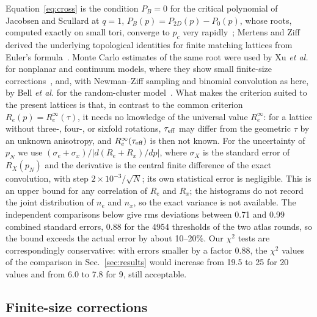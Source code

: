 \documentclass[pre,twocolumn,superscriptaddress,longbibliography,floatfix]{revtex4-2}
\newcommand{\pc}{p_c}
\begin{document}
Equation~\eqref{eq:cross} is the condition $P_B=0$ for the critical polynomial of Jacobsen and Scullard at $q=1$, $P_B(p)=P_{2D}(p)-P_0(p)$, whose roots, computed exactly on small tori, converge to $\pc$ very rapidly~\cite{JacobsenScullard13,Jacobsen14}; Mertens and Ziff derived the underlying topological identities for finite matching lattices from Euler's formula~\cite{MertensZiff16}. Monte Carlo estimates of the same root were used by Xu \textit{et al.} for nonplanar and continuum models, where they show small finite-size corrections~\cite{Xu21}, and, with Newman--Ziff sampling and binomial convolution as here, by Bell \textit{et al.} for the random-cluster model~\cite{Bell22}. What makes the criterion suited to the present lattices is that, in contrast to the common criterion $R_e(p)=R_e^\infty(\tau)$, it needs no knowledge of the universal value $R_e^\infty$: for a lattice without three-, four-, or sixfold rotations, $\tau_{\rm eff}$ may differ from the geometric $\tau$ by an unknown anisotropy, and $R_e^\infty(\tau_{\rm eff})$ is then not known. For the uncertainty of $p_N$ we use $(\sigma_e+\sigma_x)/|d(R_e+R_x)/dp|$, where $\sigma_X$ is the standard error of $R_X(p_N)$ and the derivative is the central finite difference of the exact convolution, with step $2\times10^{-3}/\sqrt N$; its own statistical error is negligible. This is an upper bound for any correlation of $R_e$ and $R_x$; the histograms do not record the joint distribution of $n_e$ and $n_x$, so the exact variance is not available. The independent comparisons below give rms deviations between 0.71 and 0.99 combined standard errors, 0.88 for the 4954 thresholds of the two atlas rounds, so the bound exceeds the actual error by about 10--20\%. Our $\chi^2$ tests are correspondingly conservative: with errors smaller by a factor 0.88, the $\chi^2$ values of the comparison in Sec.~\ref{sec:results} would increase from 19.5 to 25 for 20 values and from 6.0 to 7.8 for 9, still acceptable.

\subsection{Finite-size corrections}
\end{document}
